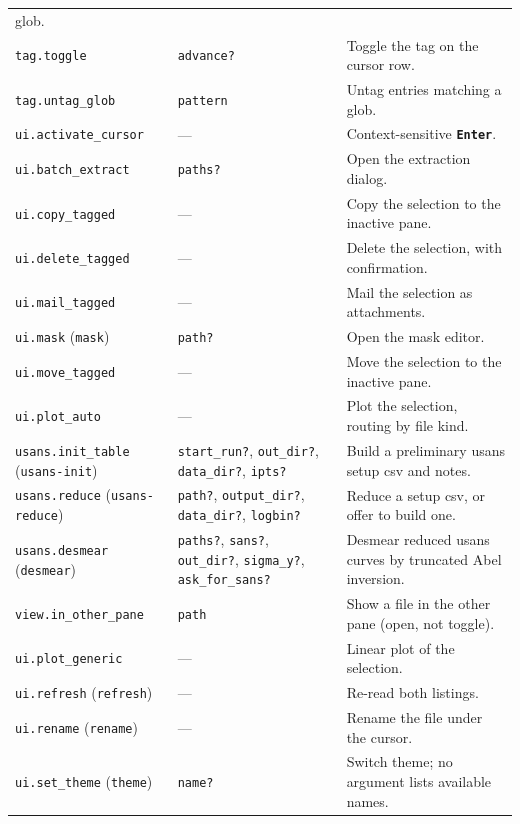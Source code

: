 \documentclass[tm]{ornltm}
\newcommand{\key}[1]{\textbf{\texttt{#1}}}
\begin{document}
\begin{small}
\begin{longtable}{p{} p{} p{}}
    glob. \\
  \texttt{tag.toggle} & \texttt{advance?} & Toggle the tag on the cursor
    row. \\
  \texttt{tag.untag\_glob} & \texttt{pattern} & Untag entries matching a
    glob. \\
  \texttt{ui.activate\_cursor} & --- & Context-sensitive \key{Enter}. \\
  \texttt{ui.batch\_extract} & \texttt{paths?} & Open the extraction dialog. \\
  \texttt{ui.copy\_tagged} & --- & Copy the selection to the inactive pane. \\
  \texttt{ui.delete\_tagged} & --- & Delete the selection, with
    confirmation. \\
  \texttt{ui.mail\_tagged} & --- & Mail the selection as attachments. \\
  \texttt{ui.mask} (\texttt{mask}) & \texttt{path?} & Open the mask editor. \\
  \texttt{ui.move\_tagged} & --- & Move the selection to the inactive pane. \\
  \texttt{ui.plot\_auto} & --- & Plot the selection, routing by file kind. \\
  \texttt{usans.init\_table} (\texttt{usans-init}) & \texttt{start\_run?},
    \texttt{out\_dir?}, \texttt{data\_dir?}, \texttt{ipts?} & Build a
    preliminary \ac{usans} setup \ac{csv} and notes. \\
  \texttt{usans.reduce} (\texttt{usans-reduce}) & \texttt{path?},
    \texttt{output\_dir?}, \texttt{data\_dir?}, \texttt{logbin?} & Reduce a
    setup \ac{csv}, or offer to build one. \\
  \texttt{usans.desmear} (\texttt{desmear}) & \texttt{paths?},
    \texttt{sans?}, \texttt{out\_dir?}, \texttt{sigma\_y?},
    \texttt{ask\_for\_sans?} & Desmear
    reduced \ac{usans} curves by truncated Abel inversion. \\
  \texttt{view.in\_other\_pane} & \texttt{path} & Show a file in the other pane
    (open, not toggle). \\
  \texttt{ui.plot\_generic} & --- & Linear plot of the selection. \\
  \texttt{ui.refresh} (\texttt{refresh}) & --- & Re-read both listings. \\
  \texttt{ui.rename} (\texttt{rename}) & --- & Rename the file under the
    cursor. \\
  \texttt{ui.set\_theme} (\texttt{theme}) & \texttt{name?} & Switch theme; no
    argument lists available names. \\

\end{longtable}
\end{small}
\end{document}
